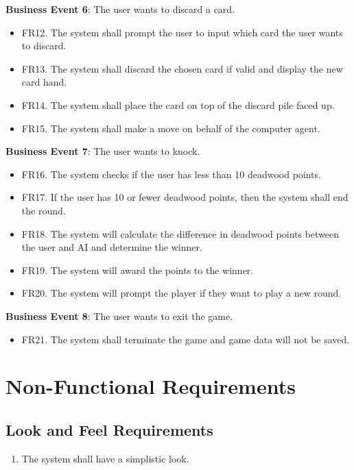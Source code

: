 \documentclass[12pt, titlepage]{article}
\begin{document}
\textbf{Business Event 6}: The user wants to discard a card.
\begin{itemize}
    \item FR12. The system shall prompt the user to input which card the user wants to discard.
    \item FR13. The system shall discard the chosen card if valid and display the new card hand.
    \item FR14. The system shall place the card on top of the discard pile faced up.
    \item FR15. The system shall make a move on behalf of the computer agent.
\end{itemize}

\textbf{Business Event 7}: The user wants to knock.
\begin{itemize}
    \item FR16. The system checks if the user has less than 10 deadwood points.
    \item FR17. If the user has 10 or fewer deadwood points, then the system shall end the round. 
    \item FR18. The system will calculate the difference in deadwood points between the user and AI and determine the winner.
    \item FR19. The system will award the points to the winner.
    \item FR20. The system will prompt the player if they want to play a new round.
\end{itemize}

\textbf{Business Event 8}: The user wants to exit the game.
\begin{itemize}
    \item FR21. The system shall terminate the game and game data will not be saved.
\end{itemize}

\section{Non-Functional Requirements}

\subsection{Look and Feel Requirements}
\begin{enumerate}[{LF}.1]
    \item The system shall have a simplistic look.
\end{enumerate}
\end{document}
